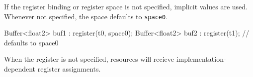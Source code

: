 If the register binding or register space is not specified, implicit values are used.
Whenever not specified, the space defaults to \texttt{space0}.

\begin{HLSL}
  Buffer<float2> buf1 : register(t0, space0);
  Buffer<float2> buf2 : register(t1); // defaults to space0
\end{HLSL}

When the register is not specified, resources will recieve implementation-dependent register assignments.
